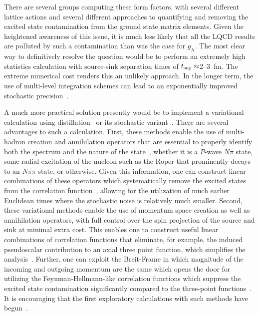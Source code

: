 \documentclass{ar-1col}
\def\tsep{t_{\rm sep}}
\begin{document}
There are several groups computing these form factors, with several different lattice actions and several different approaches to quantifying and removing the excited state contamination from the ground state matrix elements.
Given the heightened awareness of this issue, it is much less likely that all the LQCD results are polluted by such a contamination than was the case for $g_{\mathrm{A}}$.
The most clear way to definitively resolve the question would be to perform an extremely high statistics calculation with source-sink separation times of $\tsep\approx$2--3~fm.  The extreme numerical cost
renders this an unlikely approach.
In the longer term, the use of multi-level integration schemes can lead to an exponentially improved stochastic precision~\cite{Ce:2016idq}.

A much more practical solution presently would be to implement a variational calculation using distillation~\cite{HadronSpectrum:2009krc} or its stochastic variant~\cite{Morningstar:2011ka}.
There are several advantages to such a calculation.
First, these methods enable the use of multi-hadron creation and annihilation operators
 that are essential to properly identify both the spectrum and the nature of the state~\cite{Dudek:2012xn,Lang:2012db},
 whether it is a $P$-wave $N\pi$ state,
 some radial excitation of the nucleon such as the Roper
 that prominently decays to an $N\pi\pi$ state,
 or otherwise.
Given this information, one can construct linear combinations of these operators which systematically remove the excited states from the correlation function~\cite{Blossier:2009kd}, allowing for the utilization of much earlier Euclidean times where the stochastic noise is relatively much smaller.
Second, these variational methods enable the use of momentum space creation as well as annihilation operators, with full control over the spin projection of the source and sink at minimal extra cost.
This enables one to construct useful linear combinations of correlation functions that eliminate, for example, the induced pseudoscalar contribution to an axial three point function, which simplifies the analysis~\cite{Meyer:2017ddy}.
Further, one can exploit the Breit-Frame in which magnitude of the incoming and outgoing momentum are the same which opens the door for utilizing the Feynman-Hellmann-like correlation functions which suppress the excited state contamination significantly compared to the three-point functions~\cite{He:2021yvm}.
It is encouraging that the first exploratory calculations with such methods have begun~\cite{Egerer:2018xgu,Barca:2021iak}.
\end{document}

